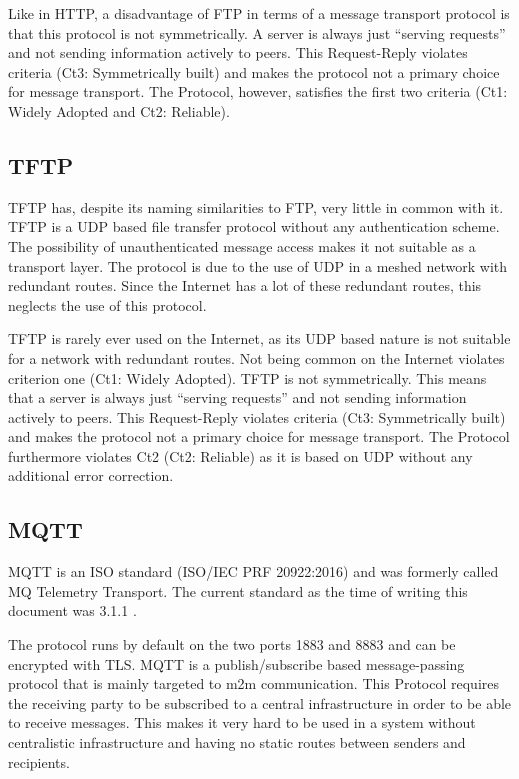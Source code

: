 Like in HTTP, a disadvantage of FTP in terms of a message transport protocol is that this protocol is not symmetrically. A server is always just ``serving requests'' and not sending information actively to peers. This Request-Reply violates criteria (Ct3: Symmetrically built) and makes the protocol not a primary choice for message transport. The Protocol, however, satisfies the first two criteria  (Ct1: Widely Adopted and Ct2: Reliable).

\subsection{TFTP}
TFTP has, despite its naming similarities to FTP, very little in common with it. TFTP is a UDP based file transfer protocol without any authentication scheme. The possibility of unauthenticated message access makes it not suitable as a transport layer. The protocol is due to the use of UDP in a meshed network with redundant routes. Since the Internet has a lot of these redundant routes, this neglects the use of this protocol.

TFTP is rarely ever used on the Internet, as its UDP based nature is not suitable for a network with redundant routes. Not being common on the Internet violates criterion one (Ct1: Widely Adopted). TFTP is not symmetrically. This means that a server is always just ``serving requests'' and not sending information actively to peers. This Request-Reply violates criteria (Ct3: Symmetrically built) and makes the protocol not a primary choice for message transport. The Protocol furthermore violates Ct2 (Ct2: Reliable) as it is based on UDP without any additional error correction.

\subsection{MQTT}
MQTT is an ISO standard (ISO/IEC PRF 20922:2016) and was formerly called MQ Telemetry Transport. The current standard as the time of writing this document was 3.1.1 \cite{mqtt}. 

The protocol runs by default on the two ports 1883 and 8883 and can be encrypted with TLS. MQTT is a publish/subscribe based message-passing protocol that is mainly targeted to m2m communication. This Protocol requires the receiving party to be subscribed to a central infrastructure in order to be able to receive messages. This makes it very hard to be used in a system without centralistic infrastructure and having no static routes between senders and recipients. 

